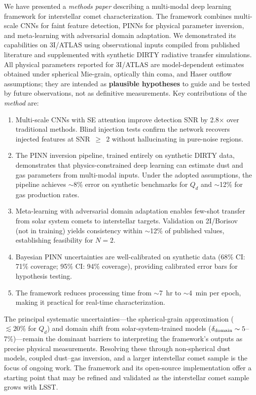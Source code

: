 \documentclass[preprint2]{aastex631}
\begin{document}
We have presented a \textit{methods paper} describing a multi-modal deep learning framework for interstellar comet characterization. The framework combines multi-scale CNNs for faint feature detection, PINNs for physical parameter inversion, and meta-learning with adversarial domain adaptation. We demonstrated its capabilities on 3I/ATLAS using observational inputs compiled from published literature and supplemented with synthetic DIRTY radiative transfer simulations. All physical parameters reported for 3I/ATLAS are model-dependent estimates obtained under spherical Mie-grain, optically thin coma, and Haser outflow assumptions; they are intended as \textbf{plausible hypotheses} to guide and be tested by future observations, not as definitive measurements. Key contributions of the \textit{method} are:

\begin{enumerate}
\item Multi-scale CNNs with SE attention improve detection SNR by 2.8$\times$ over traditional methods. Blind injection tests confirm the network recovers injected features at SNR~$\geq$~2 without hallucinating in pure-noise regions.
\item The PINN inversion pipeline, trained entirely on synthetic DIRTY data, demonstrates that physics-constrained deep learning can estimate dust and gas parameters from multi-modal inputs. Under the adopted assumptions, the pipeline achieves $\sim$8\% error on synthetic benchmarks for $Q_d$ and $\sim$12\% for gas production rates.
\item Meta-learning with adversarial domain adaptation enables few-shot transfer from solar system comets to interstellar targets. Validation on 2I/Borisov (not in training) yields consistency within $\sim$12\% of published values, establishing feasibility for $N=2$.
\item Bayesian PINN uncertainties are well-calibrated on synthetic data (68\% CI: 71\% coverage; 95\% CI: 94\% coverage), providing calibrated error bars for hypothesis testing.
\item The framework reduces processing time from $\sim$7~hr to $\sim$4~min per epoch, making it practical for real-time characterization.
\end{enumerate}

The principal systematic uncertainties---the spherical-grain approximation ($\lesssim 20\%$ for $Q_d$) and domain shift from solar-system-trained models ($\delta_{\rm domain} \sim 5$--7\%)---remain the dominant barriers to interpreting the framework's outputs as precise physical measurements. Resolving these through non-spherical dust models, coupled dust--gas inversion, and a larger interstellar comet sample is the focus of ongoing work. The framework and its open-source implementation offer a starting point that may be refined and validated as the interstellar comet sample grows with LSST.
\end{document}
